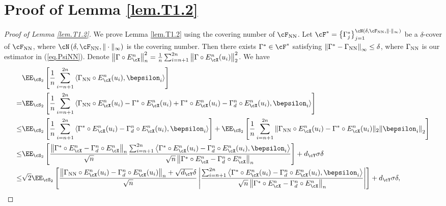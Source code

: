 \documentclass[11pt]{article} %
\begin{document}
\section{Proof of Lemma \ref{lem.T1.2}}\label{lem.T1.2.proof}
\begin{proof}[Proof of Lemma \ref{lem.T1.2}]
	We prove Lemma \ref{lem.T1.2} using the covering number of $\cF_{\rm NN}$. Let $\cF^*=\left\{\Gamma^*_j\right\}_{j=1}^{\cN\left(\delta,\cF_{\rm NN},\|\cdot\|_{\infty}\right)}$ be a $\delta$-cover of $\cF_{\rm NN}$, where $\cN\left(\delta,\cF_{\rm NN},\|\cdot\|_{\infty}\right)$ is the covering number. Then there exists $\Gamma^*\in \cF^*$ satisfying $\left\|\Gamma^*-\Gamma_{\rm NN}\right\|_{\infty}\leq \delta$, where $\Gamma_{\rm NN}$ is our estimator in (\ref{eq.PsiNN}). Denote $\left\|\Gamma\circ E_{\cX}^n\right\|_n^2=\frac{1}{n}\sum_{i=n+1}^{2n} \left\|\Gamma\circ E_{\cX}^n(u_i)\right\|_2^2$. We have
	\begin{align}
		&\EE_{\cS_2}\left[\frac{1}{n}\sum_{i=n+1}^{2n}\left\langle \Gamma_{\rm NN} \circ E_{\cX}^n(u_i), \bepsilon_i\right\rangle \right] \nonumber\\
		=& \EE_{\cS_2}\left[\frac{1}{n}\sum_{i=n+1}^{2n} \left\langle \Gamma_{\rm NN} \circ E_{\cX}^n(u_i)-\Gamma^* \circ E_{\cX}^n(u_i)+\Gamma^* \circ E_{\cX}^n(u_i)-\Gamma_{d}^n \circ E_{\cX}^n(u_i), \bepsilon_i\right\rangle \right]  \nonumber\\
		\leq &  \EE_{\cS_2}\left[\frac{1}{n}\sum_{i=n+1}^{2n} \left\langle \Gamma^* \circ E_{\cX}^n(u_i)-\Gamma_{d}^n \circ E_{\cX}^n(u_i), \bepsilon_i\right\rangle \right] + \EE_{\cS_2} \left[\frac{1}{n}\sum_{i=n+1}^{2n}\left\|\Gamma_{\rm NN} \circ E_{\cX}^n(u_i)-\Gamma^* \circ E_{\cX}^n(u_i)\|_2\|\bepsilon_i\right\|_2\right] \nonumber\\
		\leq & \EE_{\cS_2} \left[\frac{\left\|\Gamma^* \circ E_{\cX}^n-\Gamma_{d}^n \circ E_{\cX}^n\right\|_n}{\sqrt{n}} \frac{\sum_{i=n+1}^{2n} \left\langle \Gamma^* \circ E_{\cX}^n(u_i)-\Gamma_{d}^n \circ E_{\cX}^n(u_i), \bepsilon_i\right\rangle}{\sqrt{n}\left\|\Gamma^* \circ E_{\cX}^n-\Gamma_{d}^n \circ E_{\cX}^n\right\|_n}\right] +d_{\cY}\sigma\delta \nonumber\\
		\leq & \sqrt{2}\EE_{\cS_2} \left[\frac{\left\|\Gamma_{\rm NN} \circ E_{\cX}^n(u_i)-\Gamma_{d}^n \circ E_{\cX}^n(u_i)\right\|_n+\sqrt{d_{\cY}}\delta}{\sqrt{n}} \left|\frac{\sum_{i=n+1}^{2n} \left\langle \Gamma^* \circ E_{\cX}^n(u_i)-\Gamma_{d}^n \circ E_{\cX}^n(u_i), \bepsilon_i\right\rangle}{\sqrt{n}\left\|\Gamma^* \circ E_{\cX}^n-\Gamma_{d}^n \circ E_{\cX}^n\right\|_n}\right|\right] +d_{\cY}\sigma\delta,

\end{align}
\end{proof}
\end{document}
